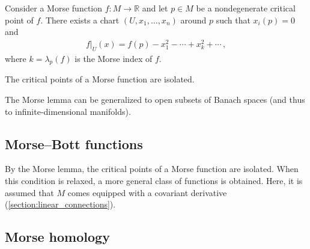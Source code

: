     \begin{property}
        Consider a Morse function $f:M\rightarrow\mathbb{R}$ and let $p\in M$ be a nondegenerate critical point of $f$. There exists a chart $(U,x_1,\ldots,x_n)$ around $p$ such that $x_i(p)=0$ and
        \begin{gather}
            f|_U(x) = f(p) - x_1^2-\cdots + x_k^2+\cdots\,,
        \end{gather}
        where $k=\lambda_p(f)$ is the Morse index of $f$.
    \end{property}
    \begin{result}
        The critical points of a Morse function are isolated.
    \end{result}
    \begin{remark}
        The Morse lemma can be generalized to open subsets of Banach spaces (and thus to infinite-dimensional manifolds).
    \end{remark}



\subsection{Morse--Bott functions}

    By the Morse lemma, the critical points of a Morse function are isolated. When this condition is relaxed, a more general class of functions is obtained. Here, it is assumed that $M$ comes equipped with a covariant derivative (\cref{section:linear_connections}).


\subsection{Morse homology}\label{section:morse_homology}

